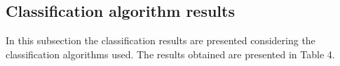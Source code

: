 \documentclass[review]{elsarticle}
\begin{document}

\subsection{Classification algorithm results}

In this subsection the classification results are presented considering the classification algorithms used. The results obtained are presented in Table 4.
\end{document}
